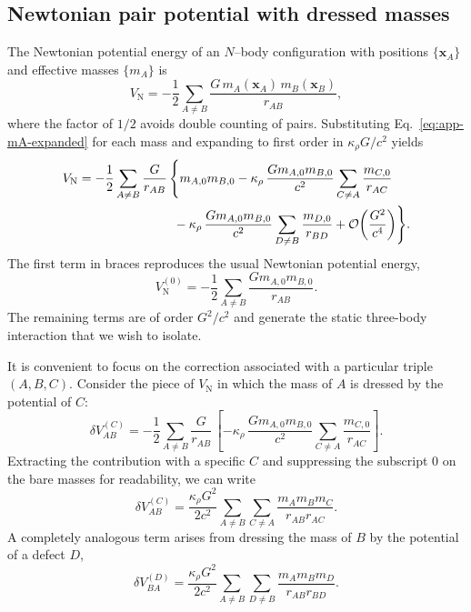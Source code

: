\documentclass[11pt]{article}
\begin{document}
\subsection{Newtonian pair potential with dressed masses}

The Newtonian potential energy of an $N$--body configuration with
positions $\{\mathbf{x}_A\}$ and effective masses $\{m_A\}$ is
\begin{equation}
  V_{\text{N}}
  = -\frac{1}{2}
    \sum_{A\neq B}
    \frac{G\,m_A(\mathbf{x}_A)\,m_B(\mathbf{x}_B)}{r_{AB}},
  \label{eq:app-VN}
\end{equation}
where the factor of $1/2$ avoids double counting of pairs.
Substituting Eq.~\eqref{eq:app-mA-expanded} for each mass and
expanding to first order in $\kappa_\rho G/c^2$ yields
\begin{align}
V_{\text{N}}
  &= -\frac{1}{2}
     \sum_{A\neq B}
     \frac{G}{r_{AB}}\,
     \Biggl\{
       m_{A,0} m_{B,0}
       - \kappa_\rho\,
         \frac{G m_{A,0} m_{B,0}}{c^2}
         \sum_{C\neq A}
         \frac{m_{C,0}}{r_{AC}}
       \nonumber\\
  &\hspace{7.5em}
       - \kappa_\rho\,
         \frac{G m_{A,0} m_{B,0}}{c^2}
         \sum_{D\neq B}
         \frac{m_{D,0}}{r_{BD}}
       + \mathcal{O}\!\left(\frac{G^2}{c^4}\right)
     \Biggr\}.
     \label{eq:app-VN-expanded}
\end{align}
The first term in braces reproduces the usual Newtonian potential
energy,
\begin{equation}
  V_{\text{N}}^{(0)}
  = -\frac{1}{2}
    \sum_{A\neq B}
    \frac{G m_{A,0} m_{B,0}}{r_{AB}}.
\end{equation}
The remaining terms are of order $G^2/c^2$ and generate the static
three-body interaction that we wish to isolate.

It is convenient to focus on the correction associated with a
particular triple $(A,B,C)$.
Consider the piece of $V_{\text{N}}$ in which the mass of $A$ is
dressed by the potential of $C$:
\begin{equation}
  \delta V_{AB}^{(C)}
  = -\frac{1}{2}
    \sum_{A\neq B}
    \frac{G}{r_{AB}}\,
    \left[
      -\kappa_\rho\,
       \frac{G m_{A,0} m_{B,0}}{c^2}
       \sum_{C\neq A}
       \frac{m_{C,0}}{r_{AC}}
    \right].
\end{equation}
Extracting the contribution with a specific $C$ and suppressing the
subscript $0$ on the bare masses for readability, we can write
\begin{equation}
  \delta V_{AB}^{(C)}
  = \frac{\kappa_\rho G^2}{2 c^2}
    \sum_{A\neq B}
    \sum_{C\neq A}
    \frac{m_A m_B m_C}{r_{AB} r_{AC}}.
  \label{eq:app-dV-ABC}
\end{equation}
A completely analogous term arises from dressing the mass of $B$ by
the potential of a defect $D$,
\begin{equation}
  \delta V_{BA}^{(D)}
  = \frac{\kappa_\rho G^2}{2 c^2}
    \sum_{A\neq B}
    \sum_{D\neq B}
    \frac{m_A m_B m_D}{r_{AB} r_{BD}}.
\end{equation}
\end{document}
